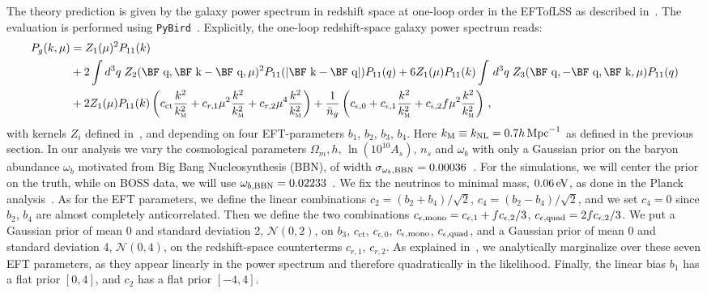\documentclass[12pt,a4paper]{article}
\def\hinvMpc{h\,{\rm Mpc}^{-1}}
\renewcommand{\(}{\left(}
\renewcommand{\)}{\right)}
\newcommand{\code}[1]{\texttt{#1}}
\def\k{{\hbox{\BF k}}}
\def\q{{\hbox{\BF q}}}
\begin{document}
The theory prediction is given by the galaxy power spectrum in redshift space at one-loop order in the EFTofLSS as described in~\cite{Perko:2016puo,DAmico:2019fhj,Nishimichi:2020tvu}.
The evaluation is performed using \code{PyBird}~\cite{DAmico:2020kxu}.
Explicitly, the one-loop redshift-space galaxy power spectrum reads:
\begin{align}\label{eq:powerspectrum}
P_{g}(k,\mu) & =  Z_1(\mu)^2 P_{11}(k)  \\
& + 2 \int d^3q\; Z_2(\q,\k-\q,\mu)^2 P_{11}(|\k-\q|)P_{11}(q) + 6 Z_1(\mu) P_{11}(k) \int\, d^3 q\; Z_3(\q,-\q,\k,\mu) P_{11}(q)\nonumber \\
& + 2 Z_1(\mu) P_{11}(k)\left( c_\text{ct}\frac{k^2}{{ k^2_\textsc{m}}} + c_{r,1}\mu^2 \frac{k^2}{k^2_\textsc{m}} + c_{r,2}\mu^4 \frac{k^2}{k^2_\textsc{m}} \right) + \frac{1}{\bar{n}_g}\left( c_{\epsilon,0}+c_{\epsilon,1}\frac{k^2}{k_\textsc{m}^2} + c_{\epsilon,2} f\mu^2 \frac{k^2}{k_\textsc{m}^2} \right) \, , \nonumber
\end{align}
with kernels $Z_i$ defined in~\cite{Perko:2016puo,DAmico:2019fhj,Nishimichi:2020tvu}, and depending on four EFT-parameters $b_1$, $b_2$, $b_3$, $b_4$. 
Here $k_{\rm M} \equiv k_{\rm NL} = 0.7 \hinvMpc$ as defined in {the} previous section. 
In our analysis we vary the cosmological parameters $\Omega_m, h$, $\ln (10^{10}A_s)$, $n_s$ and $\omega_b$ with only a Gaussian prior on the baryon abundance $\omega_b$ motivated from Big Bang Nucleosynthesis (BBN), of width $\sigma_{\omega_b, {\rm BBN}} = 0.00036$~\cite{Mossa:2020gjc}. 
For the simulations, we will center the prior on the truth, while on BOSS data, we will use $\omega_{b,{\rm BBN}} = 0.02233$~\cite{Mossa:2020gjc}. 
We fix the neutrinos to minimal mass, $0.06 \, {\rm eV}$, as done in the Planck analysis~\cite{Planck:2018vyg}.
As for the EFT parameters, we define the linear combinations $c_2 = (b_2 + b_4) / \sqrt{2}$, $c_4 = (b_2 - b_4) / \sqrt{2}$, and we set $c_4 = 0$ since $b_2$, $b_4$ are almost completely anticorrelated.
Then we define the two combinations $c_{\epsilon, \rm mono} = c_{\epsilon,1} + f c_{\epsilon,2} / 3$, $c_{\epsilon, \rm quad} = 2 f c_{\epsilon,2} / 3$. We put a Gaussian prior of mean 0 and standard deviation 2, $\mathcal{N}(0,2)$, on $b_3$, $c_\text{ct}$, $c_{\epsilon,0}$, $c_{\epsilon, \rm mono}$, $c_{\epsilon, \rm quad}$, and a Gaussian prior of mean 0 and standard deviation 4, $\mathcal{N}(0,4)$, on the redshift-space counterterms $c_{r,1}$, $c_{r,2}$.
As explained in~\cite{DAmico:2019fhj,DAmico:2020kxu}, we analytically marginalize over these seven EFT parameters, as they appear linearly in the power spectrum and therefore quadratically in the likelihood.
Finally, the linear bias $b_1$ has a flat prior $[0, 4]$, and $c_2$ has a flat prior $[-4,4]$.
\end{document}

